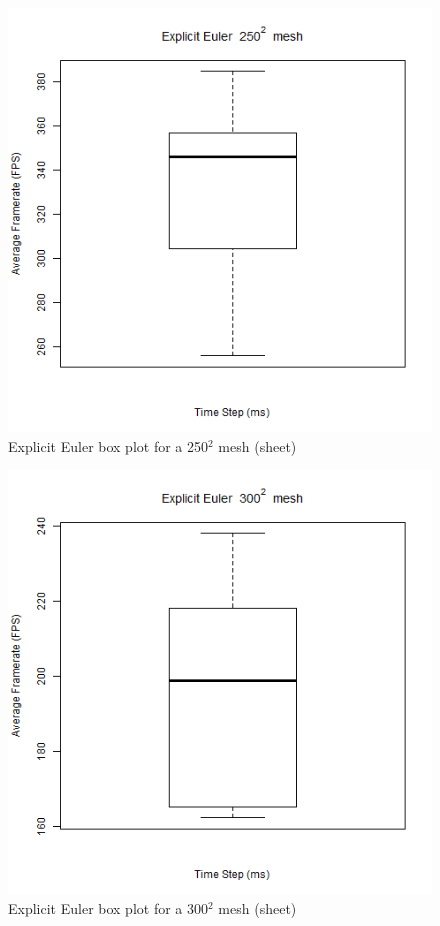      \begin{figure}
    \begin{center}
      \includegraphics[scale=.9]{Figures/sheet_ee_250_box}
    \end{center}
    \caption{Explicit Euler box plot for a 250$^{2}$ mesh (sheet)}
    \label{fig:ee box 250 sheet}
  \end{figure}
  
      \begin{figure}
    \begin{center}
      \includegraphics[scale=.9]{Figures/sheet_ee_300_box}
    \end{center}
    \caption{Explicit Euler box plot for a 300$^{2}$ mesh (sheet)}
    \label{fig:ee box 300 sheet}
  \end{figure}

